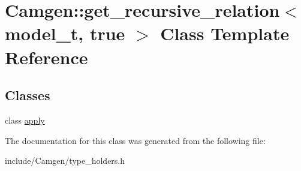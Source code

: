 \hypertarget{a00248}{\section{Camgen\-:\-:get\-\_\-recursive\-\_\-relation$<$ model\-\_\-t, true $>$ Class Template Reference}
\label{a00248}
}
\subsection*{Classes}
\begin{DoxyCompactItemize}
\item 
class \hyperlink{a00014}{apply}
\end{DoxyCompactItemize}


The documentation for this class was generated from the following file\-:\begin{DoxyCompactItemize}
\item 
include/\-Camgen/type\-\_\-holders.\-h\end{DoxyCompactItemize}

